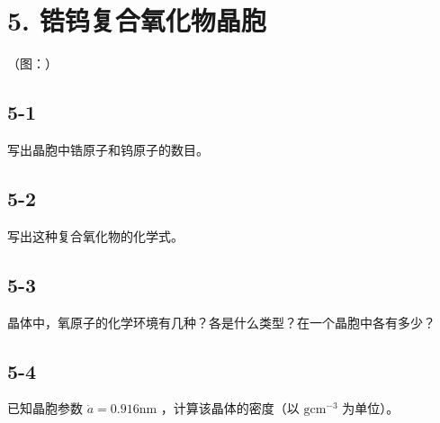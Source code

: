 \section*{5. 锆钨复合氧化物晶胞}
（图：）

\subsection*{5-1}
写出晶胞中锆原⼦和钨原⼦的数⽬。

\subsection*{5-2}
写出这种复合氧化物的化学式。

\subsection*{5-3}
晶体中，氧原⼦的化学环境有⼏种？各是什么类型？在⼀个晶胞中各有多少？

\subsection*{5-4}
已知晶胞参数 $\dot { a } = 0 . 9 1 6 \mathrm { n m }$ ，计算该晶体的密度（以 $\mathrm { g c m ^ { - 3 } }$ 为单位）。
